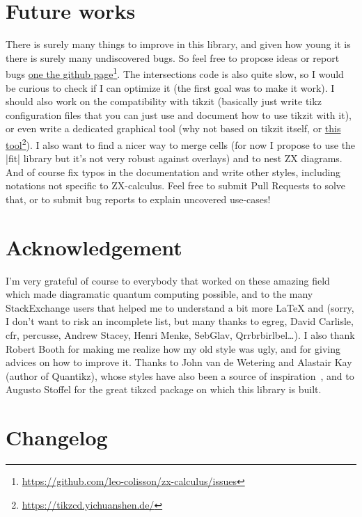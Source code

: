 \documentclass[a4paper,doc2]{ltxdoc} %
\newcommand{\mylink}[2]{\href{#1}{#2}\footnote{\url{#1}}}
\begin{document}
\section{Future works}

There is surely many things to improve in this library, and given how young it is there is surely many undiscovered bugs. So feel free to propose ideas or report bugs \mylink{https://github.com/leo-colisson/zx-calculus/issues}{one the github page}. The intersections code is also quite slow, so I would be curious to check if I can optimize it (the first goal was to make it work). I should also work on the compatibility with tikzit (basically just write tikz configuration files that you can just use and document how to use tikzit with it), or even write a dedicated graphical tool (why not based on tikzit itself, or \mylink{https://tikzcd.yichuanshen.de/}{this tool}). I also want to find a nicer way to merge cells (for now I propose to use the |fit| library but it's not very robust against overlays) and to nest ZX diagrams. And of course fix typos in the documentation and write other styles, including notations not specific to ZX-calculus. Feel free to submit Pull Requests to solve that, or to submit bug reports to explain uncovered use-cases!

\section{Acknowledgement}

I'm very grateful of course to everybody that worked on these amazing field which made diagramatic quantum computing possible, and to the many StackExchange users that helped me to understand a bit more \LaTeX{} and \tikzname{} (sorry, I don't want to risk an incomplete list, but many thanks to egreg, David Carlisle, cfr, percusse, Andrew Stacey, Henri Menke, SebGlav, Qrrbrbirlbel\dots{}). I also thank Robert Booth for making me realize how my old style was ugly, and for giving advices on how to improve it. Thanks to John van de Wetering and Alastair Kay (author of Quantikz), whose styles have also been a source of inspiration~\cite{van20_ZXcalculusWorkingQuantum}, and to Augusto Stoffel for the great tikzcd package on which this library is built.

\section{Changelog}
\end{document}
